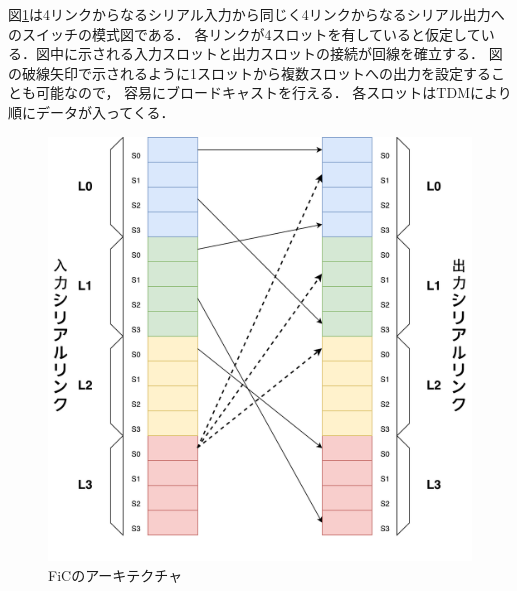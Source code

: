{  図\ref{fig:arch-sw}は4リンクからなるシリアル入力から同じく4リンクからなるシリアル出力へのスイッチの模式図である．
  各リンクが4スロットを有していると仮定している．図中に示される入力スロットと出力スロットの接続が回線を確立する．
  図の破線矢印で示されるように1スロットから複数スロットへの出力を設定することも可能なので，
  容易にブロードキャストを行える．
  各スロットはTDMにより順にデータが入ってくる．
  
   \begin{figure}[h]
     \centering
     \includegraphics[width=12cm]{./chap3/fig/arch_sw.pdf}
     \caption{FiCのアーキテクチャ}
     \label{fig:arch-sw}
   \end{figure}
}
